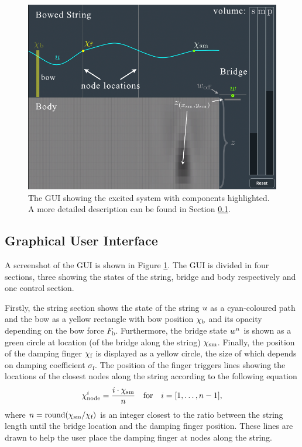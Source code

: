     \begin{figure}[t]
      \centering
      \includegraphics[width=\paperFigWidth\textwidth]{figures/applicationDescription.pdf}
      \caption{The GUI showing the excited system with components highlighted. A more detailed description can be found in Section \ref{sec:GUI}. %
      }
      \label{fig:GUI}
    \end{figure}
    \subsection{Graphical User Interface}\label{sec:GUI}
    A screenshot of the GUI is shown in Figure \ref{fig:GUI}. The GUI is divided in four sections, three showing the states of the string, bridge and body respectively and one control section. 
    
    Firstly, the string section shows the state of the string $u$ as a cyan-coloured path and the bow as a yellow rectangle with bow position $\chi_\text{b}$ and its opacity depending on the bow force $F_\text{b}$. Furthermore, the bridge state $w^n$ is shown as a green circle at location (of the bridge along the string) $\chi_\text{sm}$. Finally, the position of the damping finger $\chi_\text{f}$ is displayed as a yellow circle, the size of which depends on damping coefficient $\sigma_\text{f}$. The position of the finger triggers lines showing the locations of the closest nodes along the string according to the following equation
    \begin{equation}\label{eq:node}
        \chi_\text{node}^i = \frac{i\cdot \chi_\text{sm}}{n}\quad \text{for} \quad i = [1,\hdots,n-1],
    \end{equation}
    where $n = \text{round} (\chi_\text{sm}/\chi_\text{f})$ is an integer closest to the ratio between the string length until the bridge location and the damping finger position. These lines are drawn to help the user place the damping finger at nodes along the string.
    
